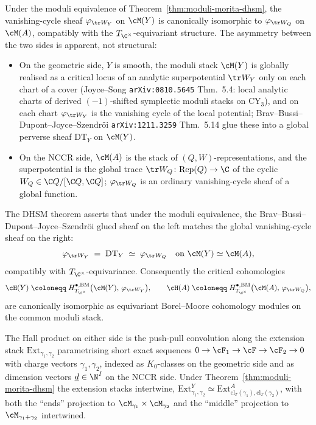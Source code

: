 \begin{theorem}
\label{thm:vanishing-cycle-transport-dhsm}
Under the moduli equivalence of Theorem~\ref{thm:moduli-morita-dhsm}, the vanishing-cycle sheaf $\varphi_{\tr W_Y}$ on $\cM(Y)$ is canonically isomorphic to $\varphi_{\tr W_Q}$ on $\cM(A)$, compatibly with the $T_{\C^\times}$-equivariant structure. The asymmetry between the two sides is apparent, not structural:
\begin{itemize}
 \item On the geometric side, $Y$ is smooth, the moduli stack $\cM(Y)$ is globally realised as a critical locus of an analytic superpotential $\tr W_Y$ only on each chart of a cover (Joyce--Song \texttt{arXiv:0810.5645} Thm.~5.4: local analytic charts of derived $(-1)$-shifted symplectic moduli stacks on CY$_3$), and on each chart $\varphi_{\tr W_Y}$ is the vanishing cycle of the local potential; Brav--Bussi--Dupont--Joyce--Szendr\"oi \texttt{arXiv:1211.3259} Thm.~5.14 glue these into a global perverse sheaf $\mathrm{DT}_Y$ on $\cM(Y)$.
 \item On the NCCR side, $\cM(A)$ is the stack of $(Q, W)$-representations, and the superpotential is the global trace $\tr W_Q \colon \mathrm{Rep}(Q) \to \C$ of the cyclic $W_Q \in \C Q / [\C Q, \C Q]$; $\varphi_{\tr W_Q}$ is an ordinary vanishing-cycle sheaf of a global function.
\end{itemize}
The DHSM theorem asserts that under the moduli equivalence, the Brav--Bussi--Dupont--Joyce--Szendr\"oi glued sheaf on the left matches the global vanishing-cycle sheaf on the right:
\[
 \varphi_{\tr W_Y} \;=\; \mathrm{DT}_Y \;\simeq\; \varphi_{\tr W_Q} \quad \text{on } \cM(Y) \simeq \cM(A),
\]
compatibly with $T_{\C^\times}$-equivariance. Consequently the critical cohomologies
\[
 \cH(Y) \;\coloneqq\; H^{\bullet, \mathrm{BM}}_{T_{\C^\times}}\bigl(\cM(Y),\, \varphi_{\tr W_Y}\bigr),
 \qquad
 \cH(A) \;\coloneqq\; H^{\bullet, \mathrm{BM}}_{T_{\C^\times}}\bigl(\cM(A),\, \varphi_{\tr W_Q}\bigr),
\]
are canonically isomorphic as equivariant Borel--Moore cohomology modules on the common moduli stack.
\end{theorem}

The Hall product on either side is the push-pull convolution along the extension stack $\mathrm{Ext}_{\gamma_1, \gamma_2}$ parametrising short exact sequences $0 \to \cF_1 \to \cF \to \cF_2 \to 0$ with charge vectors $\gamma_1, \gamma_2$, indexed as $K_{0}$-classes on the geometric side and as dimension vectors $\underline d \in \N^{I}$ on the NCCR side. Under Theorem~\ref{thm:moduli-morita-dhsm} the extension stacks intertwine, $\mathrm{Ext}_{\gamma_1, \gamma_2}^{Y} \simeq \mathrm{Ext}_{\mathrm{cl}_T(\gamma_1), \mathrm{cl}_T(\gamma_2)}^{A}$, with both the ``ends'' projection to $\cM_{\gamma_1} \times \cM_{\gamma_2}$ and the ``middle'' projection to $\cM_{\gamma_1 + \gamma_2}$ intertwined.

